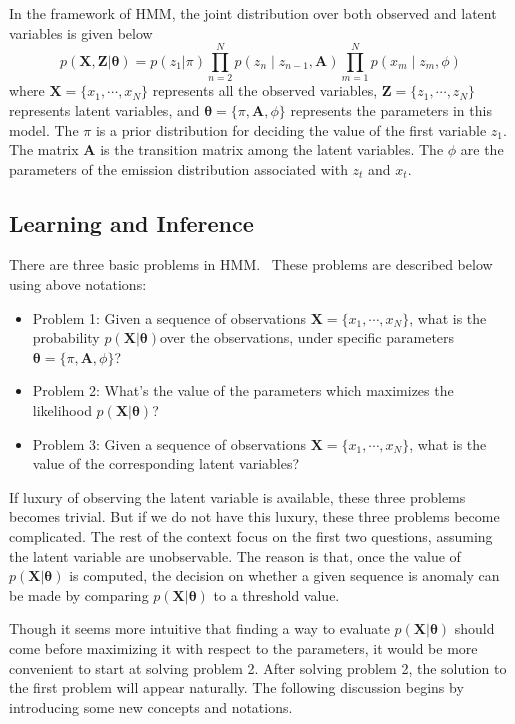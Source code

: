 In the framework of HMM, the joint distribution over both observed and latent variables is given below
\begin{equation}
	p(\mathbf{X}, \mathbf{Z} | \boldsymbol{\theta}) = p(z_1 | \pi) \prod_{n=2}^{N}p(z_n\mid z_{n-1}, \mathbf{A}) \prod_{m=1}^{N}p(x_m\mid z_m, \phi)
	\label{eq:HMMcomplete}
\end{equation}
where \(\mathbf{X} = \{x_1, \cdots, x_N\}\) represents all the observed variables, \(\mathbf{Z} = \{z_1, \cdots, z_N\}\) represents latent variables, and \(\boldsymbol{\theta} = \{\pi, \mathbf{A}, \phi\}\) represents the parameters in this model. The \(\pi\) is a prior distribution for deciding the value of the first variable \(z_1\). The matrix \(\mathbf{A}\) is the transition matrix among the latent variables. The \(\phi\) are the parameters of the emission distribution associated with \(z_t\) and \(x_t\).

\subsection{Learning and Inference}
There are three basic problems in HMM.~\cite{rabiner1989tutorial}  These problems are described below using above notations:
\begin{itemize}
	\item Problem 1: Given a sequence of observations \(\mathbf{X} = \{x_1, \cdots, x_N\}\), what is the probability \(p(\mathbf{X} | \boldsymbol{\theta}) 			  \)over the observations, under specific parameters \(\boldsymbol{\theta} = \{\pi, \mathbf{A}, \phi\}\)?
	\item Problem 2: What's the value of the parameters which maximizes the likelihood \(p(\mathbf{X} | \boldsymbol{\theta})\)?
	\item Problem 3: Given a sequence of observations \(\mathbf{X} = \{x_1, \cdots, x_N\}\), what is the value of the corresponding latent variables?
\end{itemize}
If luxury of observing the latent variable is available, these three problems becomes trivial. But if we do not have this luxury, these three problems become complicated. The rest of the context focus on the first two questions, assuming the latent variable are unobservable. The reason is that, once the value of \(p(\mathbf{X} | \boldsymbol{\theta})\) is computed, the decision on whether a given sequence is anomaly can be made by comparing \(p(\mathbf{X} | \boldsymbol{\theta})\) to a threshold value.

Though it seems more intuitive that finding a way to evaluate \(p(\mathbf{X} | \boldsymbol{\theta})\) should come before maximizing it with respect to the parameters, it would be more convenient to start at solving problem 2. After solving problem 2, the solution to the first problem will appear naturally. The following discussion begins by introducing some new concepts and notations.

